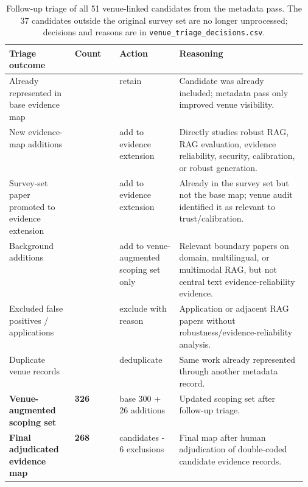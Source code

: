 \begin{table}[t]
\centering
\scriptsize
\renewcommand{\arraystretch}{0.94}
\begin{tabularx}{\linewidth}{>{\raggedright\arraybackslash}p{0.22\linewidth}>{\raggedright\arraybackslash}p{0.15\linewidth}>{\raggedright\arraybackslash}p{0.20\linewidth}X}
\toprule
\textbf{Triage outcome} & \textbf{Count} & \textbf{Action} & \textbf{Reasoning} \\
\midrule
Already represented in base evidence map & 13 & retain & Candidate was already included; metadata pass only improved venue visibility. \\
New evidence-map additions & 23 & add to evidence extension & Directly studies robust RAG, RAG evaluation, evidence reliability, security, calibration, or robust generation. \\
Survey-set paper promoted to evidence extension & 1 & add to evidence extension & Already in the survey set but not the base map; venue audit identified it as relevant to trust/calibration. \\
Background additions & 3 & add to venue-augmented scoping set only & Relevant boundary papers on domain, multilingual, or multimodal RAG, but not central text evidence-reliability evidence. \\
Excluded false positives / applications & 9 & exclude with reason & Application or adjacent RAG papers without robustness/evidence-reliability analysis. \\
Duplicate venue records & 2 & deduplicate & Same work already represented through another metadata record. \\
\midrule
\textbf{Venue-augmented scoping set} & \textbf{326} & base 300 + 26 additions & Updated scoping set after follow-up triage. \\
\textbf{Final adjudicated evidence map} & \textbf{268} & 274 candidates - 6 exclusions & Final map after human adjudication of double-coded candidate evidence records. \\
\bottomrule
\end{tabularx}
\caption{Follow-up triage of all 51 venue-linked candidates from the metadata pass. The 37 candidates outside the original survey set are no longer unprocessed; decisions and reasons are in \texttt{venue\_triage\_decisions.csv}.}
\label{tab:venue-triage-summary}
\end{table}
